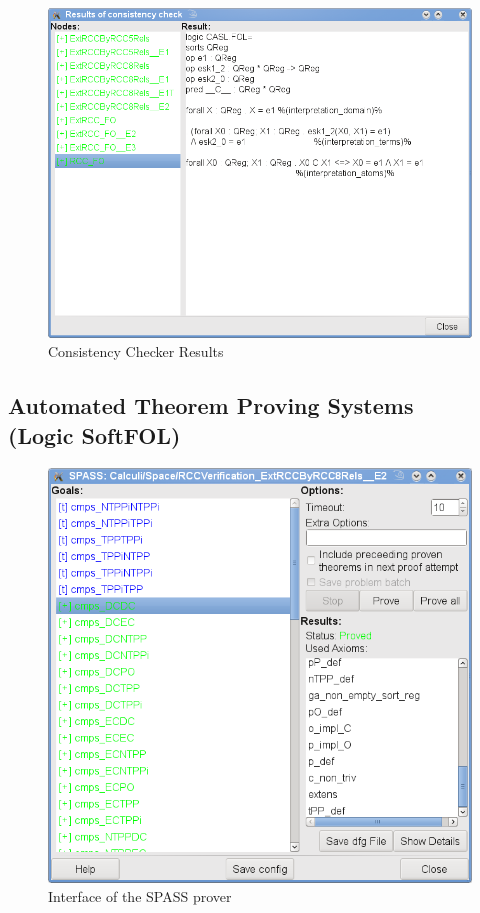 \documentclass{article}
\newcommand{\normalTEXTSC}[2]{{#1\scriptsize#2}}
\newcommand     {\SPASS}{\normalTEXTSC{S}{PASS}\xspace}
\begin{document}
\begin{figure}
\centering
\includegraphics[width=\textwidth]{ConsCheckResults}
\caption{Consistency Checker Results\label{fig:cons_res}}
\end{figure}

\subsection[Automated Theorem Proving Systems]
{Automated Theorem Proving Systems\\(Logic SoftFOL)}
\label{sec:ATP}

\begin{figure}
\centering
\includegraphics[width=\textwidth]{spassGUI1}
\caption{Interface of the \SPASS prover\label{fig:SPASS_GUI}}
\end{figure}
\end{document}
